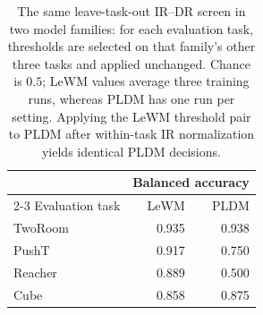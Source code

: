\begin{table}[t]
\centering
\caption{The same leave-task-out IR--DR screen in two model families: for each evaluation task, thresholds are selected on that family's other three tasks and applied unchanged. Chance is $0.5$; LeWM values average three training runs, whereas PLDM has one run per setting. Applying the LeWM threshold pair to PLDM after within-task IR normalization yields identical PLDM decisions.}
\label{tab:pldm-architecture-portability}
\small
\setlength{\tabcolsep}{6pt}
\begin{tabular}{lrr}
\toprule
 & \multicolumn{2}{c}{Balanced accuracy} \\
\cmidrule(lr){2-3}
Evaluation task & LeWM & PLDM \\
\midrule
TwoRoom & 0.935 & 0.938 \\
PushT & 0.917 & 0.750 \\
Reacher & 0.889 & 0.500 \\
Cube & 0.858 & 0.875 \\
\bottomrule
\end{tabular}
\end{table}
